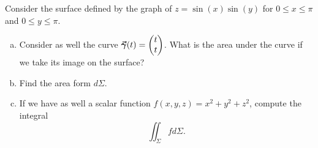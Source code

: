 \documentclass[12pt]{article} %
\begin{document}
\newpage
\begin{problem}
    Consider the surface defined by the graph of $z=\sin(x)\sin(y)$ for $0\leq x \leq \pi$ and $0\leq y\leq \pi$. 
    \begin{enumerate}[(a)]
        \item Consider as well the curve $\boldsymbol{\vec{\gamma}}(t) = \begin{pmatrix} t \\ t \end{pmatrix}$.  What is the area under the curve if we take its image on the surface?
        \item Find the area form $d\Sigma$.
        \item If we have as well a scalar function $f(x,y,z)=x^2+y^2+z^2$, compute the integral
        \[
        \iint_\Sigma f d\Sigma.
        \]
    \end{enumerate}
\end{problem}
\begin{solution}

\end{solution}
\end{document}
